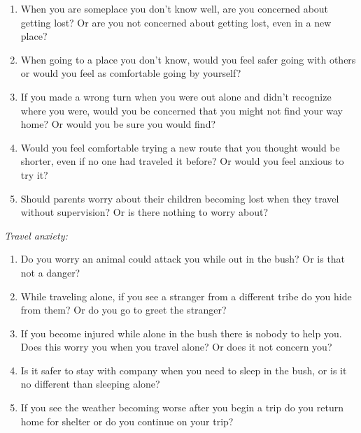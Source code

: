 \documentclass{article}
\begin{document}
\begin{enumerate}

\item When you are someplace you don't know well, are you concerned about getting lost?  Or are you not concerned about getting lost, even in a new place?

\item When going to a place you don't know, would you feel safer going with others or would you feel as comfortable going by yourself?

\item If you made a wrong turn when you were out alone and didn't recognize where you were, would you be concerned that you might not find your way home?  Or would you be sure you would find?

\item Would you feel comfortable trying a new route that you thought would be shorter, even if no one had traveled it before? Or would you feel anxious to try it?

\item Should parents worry about their children becoming lost when they travel without supervision? Or is there nothing to worry about?

\end{enumerate}

\emph{Travel anxiety:}

\begin{enumerate}

\item Do you worry an animal could attack you while out in the bush? Or is that not a danger?

\item While traveling alone, if you see a stranger from a different tribe do you hide from them? Or do you go to greet the stranger?

\item If you become injured while alone in the bush there is nobody to help you. Does this worry you when you travel alone? Or does it not concern you?

\item  Is it safer to stay with company when you need to sleep in the bush, or is it no different than sleeping alone?

\item If you see the weather becoming worse after you begin a trip do you return home for shelter or do you continue on your trip?

\end{enumerate}
\end{document}
